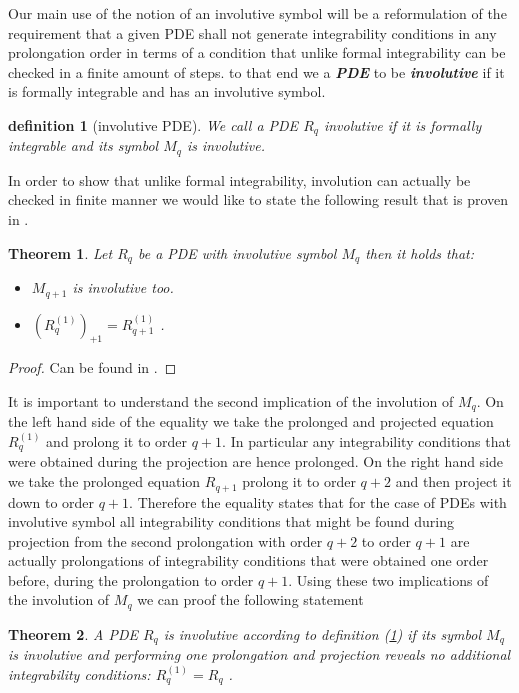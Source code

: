 \documentclass[a4paper,12pt, DIV=14, BCOR=5mm, twoside, headsepline, numbers=noenddot]{scrbook}
\newtheorem{theorem}{Theorem}[section]
\newtheorem{definition}{definition}[section]
\begin{document}
Our main use of the notion of an involutive symbol will be a reformulation of the requirement that a given PDE shall not generate integrability conditions in any prolongation order in terms of a condition that unlike formal integrability can be checked in a finite amount of steps. to that end we a \textit{\textbf{PDE}} to be \textit{\textbf{involutive}} if it is formally integrable and has an involutive symbol.
\begin{definition}[involutive PDE] \label{invol}
We call a PDE $R_q$ involutive if it is formally integrable and its symbol $M_q$ is involutive.
\end{definition}
In order to show that unlike formal integrability, involution can actually be checked in finite manner we would like to state the following result that is proven in \cite{seiler1994analysis}.
\begin{theorem}\label{invoCons}
Let $R_q$ be a PDE with involutive symbol $M_q$ then it holds that:
\begin{itemize}
    \item $M_{q+1}$ is involutive too.
    \item $(R_{q}^{(1)})_{+1} = R_{q+1}^{(1)}$ .
\end{itemize}
\end{theorem}
\begin{proof}
Can be found in \cite{seiler1994analysis}.
\end{proof}
It is important to understand the second implication of the involution of $M_q$. On the left hand side of the equality we take the prolonged and projected equation $R_q^{(1)}$ and prolong it to order $q+1$. In particular any integrability conditions that were obtained during the projection are hence prolonged. On the right hand side we take the prolonged equation $R_{q+1}$ prolong it to order $q+2$ and then project it down to order $q+1$. Therefore the equality states that for the case of PDEs with involutive symbol all integrability conditions that might be found during projection from the second prolongation with order $q+2$ to order $q+1$ are actually prolongations of integrability conditions that were obtained one order before, during the prolongation to order $q+1$.
Using these two implications of the involution of $M_q$ we can proof the following statement
\begin{theorem}
A PDE $R_q$ is involutive according to definition (\ref{invol}) if its symbol $M_q$ is involutive and performing one prolongation and projection reveals no additional integrability conditions: $R_q^{(1)} = R_q$ .
\end{theorem}
\end{document}
